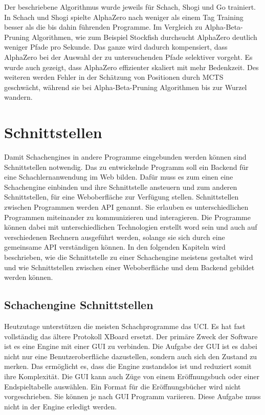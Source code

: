 Der beschriebene Algorithmus wurde jeweils für Schach, Shogi und Go trainiert. In Schach und Shogi spielte AlphaZero nach weniger als einem Tag Training besser als die bis dahin führenden Programme. Im Vergleich zu Alpha-Beta-Pruning Algorithmen, wie zum Beispiel Stockfish durchsucht AlphaZero deutlich weniger Pfade pro Sekunde. Das ganze wird dadurch kompensiert, dass AlphaZero bei der Auswahl der zu untersuchenden Pfade selektiver vorgeht. Es wurde auch gezeigt, dass AlphaZero effizienter skaliert mit mehr Bedenkzeit. Des weiteren werden Fehler in der Schätzung von Positionen durch \ac{MCTS} geschwächt, während sie bei Alpha-Beta-Pruning Algorithmen bis zur Wurzel wandern.
\cite{silver_mastering_2017}

\section{Schnittstellen}
Damit Schachengines in andere Programme eingebunden werden können sind Schnittstellen notwendig.
Das zu entwickelnde Programm soll ein Backend für eine Schachlernanwendung im Web bilden. Dafür muss es zum einen eine Schachengine einbinden und ihre Schnittstelle ansteuern und zum anderen Schnittstellen, für eine Weboberfläche zur Verfügung stellen.
Schnittstellen zwischen Programmen werden \ac{API} genannt. Sie erlauben es unterschiedlichen Programmen miteinander zu kommunizieren und interagieren. Die Programme können dabei mit unterschiedlichen Technologien erstellt word sein und auch auf verschiedenen Rechnern ausgeführt werden, solange sie sich durch eine gemeinsame \ac{API} verständigen können.
In den folgenden Kapiteln wird beschrieben, wie die Schnittstelle zu einer Schachengine meistens gestaltet wird und wie Schnittstellen zwischen einer Weboberfläche und dem Backend gebildet werden können.

\subsection{Schachengine Schnittstellen}
Heutzutage unterstützen die meisten Schachprogramme das \ac{UCI}. Es hat fast vollständig das ältere Protokoll XBoard ersetzt. Der primäre Zweck der Software ist es eine Engine mit einer GUI zu verbinden. Die Aufgabe der GUI ist es dabei nicht nur eine Benutzeroberfläche dazustellen, sondern auch sich den Zustand zu merken. Das ermöglicht es, dass die Engine zustandslos ist und reduziert somit ihre Komplexität. Die GUI kann auch Züge von einem Eröffnungsbuch oder einer Endspieltabelle auswählen. Ein Format für die Eröffnungsbücher wird nicht vorgeschrieben. Sie können je nach GUI Programm variieren. Diese Aufgabe muss nicht in der Engine erledigt werden.
\cite{wikipedia_foundation_inc_universal_2024}

